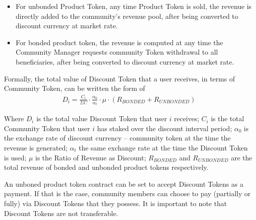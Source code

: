 \documentclass[letterpaper,11pt]{article}
\begin{document}
\begin{itemize}
\setlength\itemsep{0em}
\item For unbonded Product Token, any time Product Token is sold, the revenue is directly added to the community’s revenue pool, after being converted to discount currency at market rate.
\item For bonded product token, the revenue is computed at any time the Community Manager requests community Token withdrawal to all beneficiaries, after being converted to discount currency at market rate.
\end{itemize}

Formally, the total value of Discount Token that a user receives, in terms of Community Token, can be written the form of
\begin{align*}
D_{i} = \frac{C_{i}}{\Sigma C} \cdot \frac{\alpha_{0}}{\alpha_{t}} \cdot \mu \cdot (R_{\mathit{BONDED}} + R_{\mathit{UNBONDED}})
\end{align*}

Where $D_{i}$ is the total value Discount Token that user $i$ receives; $C_{i}$ is the total Community Token that user $i$ has staked over the discount interval period; $\alpha_{0}$ is the exchange rate of discount currency -- community token at the time the revenue is generated; $\alpha_{t}$ the same exchange rate at the time the Discount Token is used; $\mu$ is the Ratio of Revenue as Discount; $R_{\mathit{BONDED}}$ and $R_{\mathit{UNBONDED}}$ are the total revenue of bonded and unbonded product tokens respectively.

An unboned product token contract can be set to accept Discount Tokens as a payment. If that is the case, community members can choose to pay (partially or fully) via Discount Tokens that they possess. It is important to note that Discount Tokens are not transferable.
\end{document}
